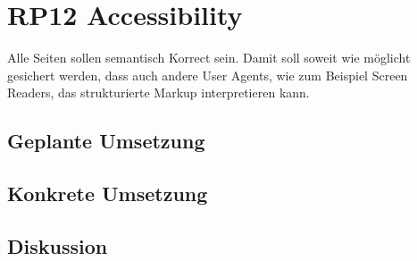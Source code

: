 \section{RP12 Accessibility}
\label{sec:principle-rp12-accessibility}

Alle Seiten sollen semantisch Korrect sein. Damit soll soweit wie möglicht gesichert werden, dass auch andere User Agents, wie zum Beispiel Screen Readers, das strukturierte Markup interpretieren kann.

\subsection*{Geplante Umsetzung}


\subsection*{Konkrete Umsetzung}


\subsection*{Diskussion}
